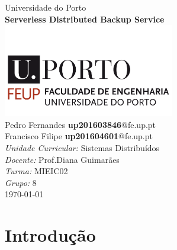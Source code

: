 \documentclass[11pt,oneside]{book}
\begin{document}
\begin{titlepage}

\begin{center}
{\LARGE Universidade do Porto}\\[1.5cm]
\linespread{1.2}\huge {\bfseries Serverless Distributed Backup Service}\\[1.5cm]
\linespread{1}
\includegraphics[width=7.5cm]{feup.png}\\[1cm]
{\large Pedro Fernandes \textbf{up201603846}@fe.up.pt}\\
{\large Francisco Filipe \textbf{up201604601}@fe.up.pt}\\[1cm]
{\large \emph{Unidade Curricular:} Sistemas Distribuídos}\\
{\large \emph{Docente:} Prof.Diana Guimarães}\\
{\large \emph{Turma:} MIEIC02}\\
{\large \emph{Grupo:} 8}\\[2cm]

\large \today
\end{center}

\end{titlepage}


\doublespacing
\tableofcontents
\singlespacing


\mainmatter

\section{Introdução}
\end{document}
